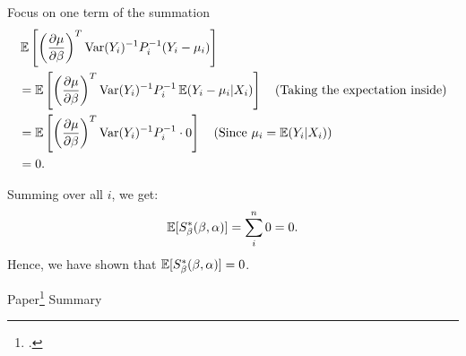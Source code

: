 \documentclass[UTF8,a4paper,10pt]{article}
\begin{document}
Focus on one term of the summation 
\begin{align*}
&\operatorname{\mathbb{E}}\left[\left(\frac{\partial \mu}{\partial \beta}\right)^T \text{Var}(Y_i)^{-1}P_{i}^{-1}(Y_i - \mu_i)\right] \\
&= \operatorname{\mathbb{E}}\left[\left(\frac{\partial \mu}{\partial \beta}\right)^T \text{Var}(Y_i)^{-1}P_{i}^{-1}\operatorname{\mathbb{E}}(Y_i - \mu_i|X_i)\right] \quad \text{(Taking the expectation inside)} \\
&= \operatorname{\mathbb{E}}\left[\left(\frac{\partial \mu}{\partial \beta}\right)^T \text{Var}(Y_i)^{-1}P_{i}^{-1}\cdot 0\right] \quad \text{(Since }\mu_i = \operatorname{\mathbb{E}}(Y_i|X_i)) \\
&= 0.
\end{align*}

Summing over all $i$, we get:
\[
\operatorname{\mathbb{E}}[S_{\beta}^*(\beta,\alpha)] = \sum_{i}^n 0 = 0.
\]
Hence, we have shown that $\operatorname{\mathbb{E}}[S_{\beta}^*(\beta,\alpha)] = 0$.

\dotfill


Paper\Footcite{Robins1995} Summary
\end{document}
